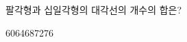 \hspace*{2mm}\begin{minipage}[t]{\dimexpr\linewidth-2mm\relax}\vspace{0pt}
팔각형과 십일각형의 대각선의 개수의 합은?
\begin{choices32}{60}{64}{68}{72}{76}\end{choices32}\end{minipage}
